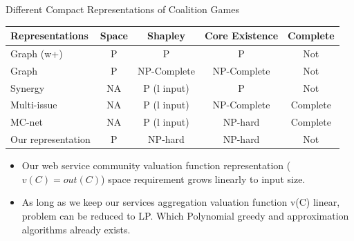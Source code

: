 \documentclass{beamer}
\begin{document}
\begin{frame}{Different Compact Representations of Coalition Games}

    \begin{table}
        \small
        \begin{tabular}{l|c|c|c|c}
        Representations                  & Space    & Shapley                  & Core Existence  & Complete     \\ \hline
        Graph (w+)                       & P        & P                        & P               & Not          \\
        Graph                            & P        & NP-Complete              & NP-Complete     & Not          \\
        Synergy                          & NA       & P (l input)              & P               & Not          \\
        Multi-issue                      & NA       & P (l input)              & NP-Complete     & Complete     \\
        MC-net                           & NA       & P (l input)              & NP-hard         & Complete     \\
        Our representation               & P        & NP-hard                  & NP-hard         & Not          \\
        \end{tabular}
    \end{table}

    \begin{itemize}
        \item Our web service community valuation function representation ($v(C) = out(C)$) space requirement grows linearly to input size.
        \item As long as we keep our services aggregation valuation function v(C) linear, problem can be reduced to LP. Which Polynomial greedy and approximation algorithms already exists.
    \end{itemize}

\end{frame}


\end{document}
